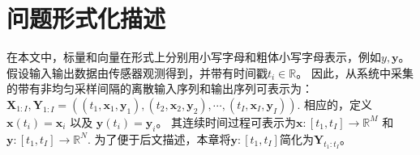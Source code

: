 \section{问题形式化描述}
\label{sec:notations}
在本文中，标量和向量在形式上分别用小写字母和粗体小写字母表示，例如$y, \boldsymbol y$。假设输入输出数据由传感器观测得到，并带有时间戳$t_i\in \mathbb{R}$。
因此，从系统中采集的带有非均匀采样间隔的离散输入序列和输出序列可表示为：
$\boldsymbol X_{1:I},\boldsymbol Y_{1:I}= ((t_1,\boldsymbol x_1,\boldsymbol y_1),(t_2,\boldsymbol x_2, \boldsymbol y_2),\cdots,(t_I,\boldsymbol x_I,\boldsymbol y_I))$. 
相应的，定义$\boldsymbol x(t_i)=\boldsymbol x_i$ 以及 $\boldsymbol y(t_i)=\boldsymbol y_i$。
其连续时间过程可表示为$\boldsymbol x:\left[t_{1}, t_{I}\right] \rightarrow \mathbb{R}^{M}$ 和 $\boldsymbol y:\left[t_{1}, t_{I}\right] \rightarrow \mathbb{R}^{N}$.
为了便于后文描述，本章将$\boldsymbol y:\left[t_{1}, t_{I}\right]$简化为$\boldsymbol Y_{t_1:t_I}$。


